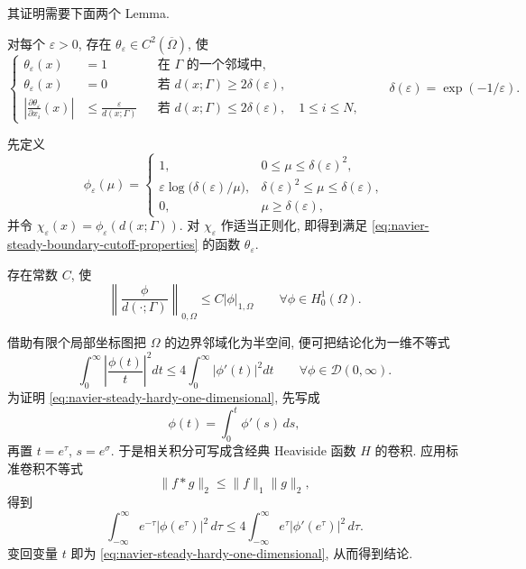 其证明需要下面两个 Lemma.

\setcounter{statement}{3}
\begin{Lemma}\label{lem:navier-steady-boundary-cutoff}
对每个 $\varepsilon>0$, 存在 $\theta_\varepsilon\in C^2(\overline\Omega)$, 使
\begin{equation}\label{eq:navier-steady-boundary-cutoff-properties}
\left\{
\begin{aligned}
\theta_\varepsilon(x)&=1&&\text{在 }\Gamma\text{ 的一个邻域中},\\
\theta_\varepsilon(x)&=0&&\text{若 }d(x;\Gamma)\geq2\delta(\varepsilon),\\
\left|\frac{\partial\theta_\varepsilon}{\partial x_i}(x)\right|
&\leq\frac{\varepsilon}{d(x;\Gamma)}
&&\text{若 }d(x;\Gamma)\leq2\delta(\varepsilon),\quad1\leq i\leq N,
\end{aligned}
\right.
\qquad
\delta(\varepsilon)=\exp(-1/\varepsilon).
\end{equation}
\end{Lemma}
\begin{Proof}
先定义
\[
\phi_\varepsilon(\mu)=
\begin{cases}
1,&0\leq\mu\leq\delta(\varepsilon)^2,\\
\varepsilon\log\bigl(\delta(\varepsilon)/\mu\bigr),
&\delta(\varepsilon)^2\leq\mu\leq\delta(\varepsilon),\\
0,&\mu\geq\delta(\varepsilon),
\end{cases}
\]
并令 $\chi_\varepsilon(x)=\phi_\varepsilon(d(x;\Gamma))$.
对 $\chi_\varepsilon$ 作适当正则化, 即得到满足
\eqref{eq:navier-steady-boundary-cutoff-properties} 的函数
$\theta_\varepsilon$.
\end{Proof}

\setcounter{statement}{4}
\begin{Lemma}\label{lem:navier-steady-hardy-boundary}
存在常数 $C$, 使
\begin{equation}\label{eq:navier-steady-hardy-boundary}
\left\|\frac{\phi}{d(\cdot;\Gamma)}\right\|_{0,\Omega}
\leq C|\phi|_{1,\Omega}
\qquad\forall\phi\in H_0^1(\Omega).
\end{equation}
\end{Lemma}
\begin{Proof}
借助有限个局部坐标图把 $\Omega$ 的边界邻域化为半空间, 便可把结论化为一维不等式
\begin{equation}\label{eq:navier-steady-hardy-one-dimensional}
\int_0^\infty\left|\frac{\phi(t)}{t}\right|^2dt
\leq4\int_0^\infty|\phi'(t)|^2dt
\qquad\forall\phi\in\mathcal D(0,\infty).
\end{equation}
为证明 \eqref{eq:navier-steady-hardy-one-dimensional}, 先写成
\[
\phi(t)=\int_0^t\phi'(s)\,ds,
\]
再置 $t=e^\tau$, $s=e^\sigma$. 于是相关积分可写成含经典
Heaviside 函数 $H$ 的卷积. 应用标准卷积不等式
\[
\|f*g\|_2\leq\|f\|_1\|g\|_2,
\]
得到
\[
\int_{-\infty}^{\infty}e^{-\tau}|\phi(e^\tau)|^2\,d\tau
\leq4\int_{-\infty}^{\infty}e^\tau|\phi'(e^\tau)|^2\,d\tau.
\]
变回变量 $t$ 即为 \eqref{eq:navier-steady-hardy-one-dimensional}, 从而得到结论.
\end{Proof}

